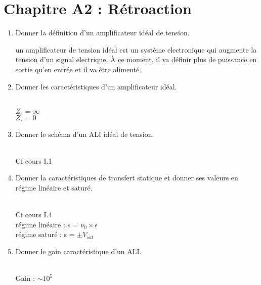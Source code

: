 \section*{\centering Chapitre A2 : Rétroaction}
\begin{enumerate}[label=\arabic{enumi} - , left=0pt, itemsep=1em] %
    \item Donner la définition d'un amplificateur idéal de tension. \par
    \begin{solution}
          un amplificateur de tension idéal est un système electronique qui augmente la tension d'un signal electrique. À ce moment, il va définir plus de puissance en sortie qu'en entrée et il va être alimenté. 
    \end{solution}


    \item Donner les caractéristiques d'un amplificateur idéal. \par
    \begin{solution}\\
        $Z_e = \infty$\\
        $Z_s = 0$
    \end{solution}

    \item Donner le schéma d'un ALI idéal de tension. \par
    \begin{solution}\\
        Cf cours I.1
    \end{solution}

    \item Donner la caractéristiques de transfert statique et donner ses valeurs en régime linéaire et saturé. \par
    \begin{solution}\\
        Cf cours I.4 \\
        régime linéaire : s = $\nu_0 \times \epsilon$ \\
        régime saturé : s = $\pm V_{sat}$
    \end{solution}

    \item Donner le gain caractéristique d'un ALI. \par
    \begin{solution}\\
        Gain : $\sim 10^5$
    \end{solution}


\end{enumerate}
